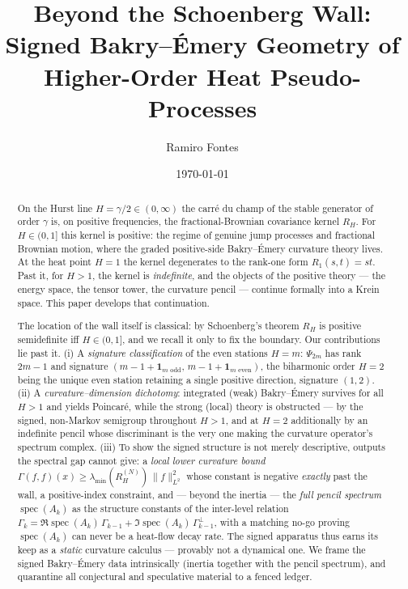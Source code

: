 \documentclass[11pt,reqno]{amsart}
\title[Beyond the Schoenberg wall]{Beyond the Schoenberg Wall:\\
Signed Bakry--\'Emery Geometry of\\ Higher-Order Heat Pseudo-Processes}
\author{Ramiro Fontes}
\date{\today}
\theoremstyle{plain}
\theoremstyle{definition}
\newcommand{\Gam}{\Gamma}
\DeclareMathOperator{\spec}{spec}
\begin{document}
\begin{abstract}
On the Hurst line $H=\gamma/2\in(0,\infty)$ the carr\'e du champ of the stable
generator of order $\gamma$ is, on positive frequencies, the fractional-Brownian
covariance kernel $R_H$. For $H\in(0,1]$ this kernel is positive: the regime of
genuine jump processes and fractional Brownian motion, where the graded
positive-side Bakry--\'Emery curvature theory lives. At the heat point
$H=1$ the kernel degenerates to the rank-one form $R_1(s,t)=st$. Past it, for
$H>1$, the kernel is \emph{indefinite}, and the objects of the positive theory ---
the energy space, the tensor tower, the curvature pencil --- continue formally
into a Krein space. This paper develops that continuation.

The location of the wall itself is classical: by Schoenberg's theorem $R_H$ is
positive semidefinite iff $H\in(0,1]$, and we recall it only to fix the boundary.
Our contributions lie past it. (i) A \emph{signature classification} of the even
stations $H=m$: $\Psi_{2m}$ has rank $2m-1$ and signature
$(m-1+\mathbf 1_{m\text{ odd}},\,m-1+\mathbf 1_{m\text{ even}})$, the biharmonic
order $H=2$ being the unique even station retaining a single positive direction,
signature $(1,2)$. (ii) A \emph{curvature--dimension dichotomy}: integrated (weak)
Bakry--\'Emery survives for all $H>1$ and yields Poincar\'e, while the strong
(local) theory is obstructed --- by the signed, non-Markov semigroup throughout
$H>1$, and at $H=2$ additionally by an indefinite pencil whose discriminant is the
very one making the curvature operator's spectrum complex. (iii) To show the
signed structure is not merely descriptive, outputs the spectral gap cannot give:
a \emph{local lower curvature bound}
$\Gam(f,f)(x)\ge\lambda_{\min}(R_H^{(N)})\,\|f\|_{L^2}^2$ whose constant is negative
\emph{exactly} past the wall, a positive-index constraint, and --- beyond the
inertia --- the \emph{full pencil spectrum} $\spec(A_k)$ as the structure constants
of the inter-level relation $\Gam_k=\Re\spec(A_k)\,\Gam_{k-1}
+\Im\spec(A_k)\,\Gam^{\perp}_{k-1}$, with a matching no-go proving $\spec(A_k)$ can
never be a heat-flow decay rate. The signed apparatus thus earns its keep as a
\emph{static} curvature calculus --- provably not a dynamical one. We frame the
signed Bakry--\'Emery data intrinsically (inertia together with the pencil
spectrum), and quarantine all conjectural and speculative material to a fenced
ledger.
\end{abstract}

\maketitle
\end{document}
